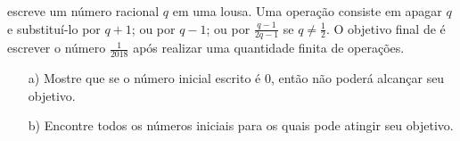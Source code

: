  escreve um número racional $q$ em uma lousa. Uma operação consiste em apagar $q$ e substituí-lo por $q + 1$; ou por $q - 1$; ou por $\frac{q-1}{2q-1}$ se $q \neq \frac{1}{2}$. O objetivo final de  é escrever o número $\frac{1}{2018}$ após realizar uma quantidade finita de operações.

\begin{itemize}
    \item[a)] Mostre que se o número inicial escrito é 0, então  não poderá alcançar seu objetivo.
    
    \item[b)] Encontre todos os números iniciais para os quais  pode atingir seu objetivo.
\end{itemize}
